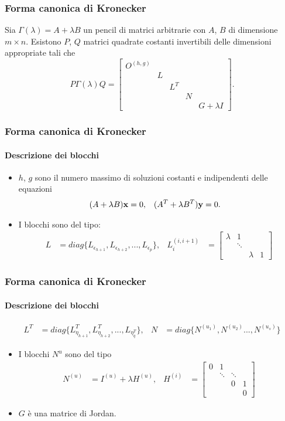 \begin{frame}
	\frametitle{Forma canonica di Kronecker}
	\begin{theorem}
		Sia \(\Gamma(\lambda) = A + \lambda B\) un pencil di matrici arbitrarie con
		$A$, $B$ di dimensione \(m \times n\). Esistono $P$, $Q$
		matrici quadrate costanti invertibili delle dimensioni appropriate tali che
		\[
			P\Gamma(\lambda)Q = \begin{bmatrix}
				O^{(h, g)} \\
				& L \\
				&& L^T \\
				&&& N \\
				&&&& G+\lambda I
			\end{bmatrix}.
		\]
	\end{theorem}
\end{frame}


\begin{frame}
	\frametitle{Forma canonica di Kronecker}
	\framesubtitle{Descrizione dei blocchi}
	\begin{itemize}
		\item $h$, $g$ sono il numero massimo di soluzioni costanti e indipendenti delle
		equazioni
		\begin{align*}
			(A + \lambda B)\vb{x} &= 0, & (A^T + \lambda B^T)\vb{y} &= 0.
		\end{align*}
		\item {} I blocchi sono del tipo:
		\begin{align*}
			L &= diag\{L_{\epsilon_{h+1}}, L_{\epsilon_{h+2}}, ..., L_{\epsilon_{p}}\},
			&
			L_{i}^{(i, i+1)} &= \begin{bmatrix}
				\lambda & 1 \\
				& \ddots \\
				& & \lambda & 1
			\end{bmatrix}
		\end{align*}
	\end{itemize}
\end{frame}


\begin{frame}
	\frametitle{Forma canonica di Kronecker}
	\framesubtitle{Descrizione dei blocchi}
	\begin{align*}
		L^T &= diag\{L_{\eta_{h+1}}^T, L_{\eta_{h+2}}^T, ..., L_{\eta_{q}^T}\},
		&
		N &= diag\{N^{(u_{1})}, N^{(u_{2})} ..., N^{(u_{s})}\}
	\end{align*}
	\begin{itemize}
		\item {} I blocchi $N^{u}$ sono del tipo
		\begin{align*}
			N^{(u)} &= I^{(u)} + \lambda H^{(u)}, &
			H^{(i)} &= \begin{bmatrix}
				0 & 1 \\
				& \ddots & \ddots \\
				& & 0 & 1 \\
				& & & 0
			\end{bmatrix}
		\end{align*}
		\item {} $G$ \`e una matrice di Jordan.
	\end{itemize}
\end{frame}


